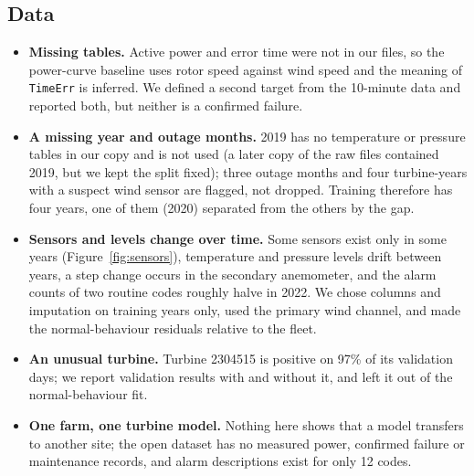 \documentclass[12pt,a4paper]{article}
\begin{document}
	\subsection{Data}
	\begin{itemize}
		\item \textbf{Missing tables.} Active power and error time were not in our files, so the power-curve baseline uses rotor speed against wind speed and the meaning of \texttt{TimeErr} is inferred. We defined a second target from the 10-minute data and reported both, but neither is a confirmed failure.
		\item \textbf{A missing year and outage months.} 2019 has no temperature or pressure tables in our copy and is not used (a later copy of the raw files contained 2019, but we kept the split fixed); three outage months and four turbine-years with a suspect wind sensor are flagged, not dropped. Training therefore has four years, one of them (2020) separated from the others by the gap.
		\item \textbf{Sensors and levels change over time.} Some sensors exist only in some years (Figure~\ref{fig:sensors}), temperature and pressure levels drift between years, a step change occurs in the secondary anemometer, and the alarm counts of two routine codes roughly halve in 2022. We chose columns and imputation on training years only, used the primary wind channel, and made the normal-behaviour residuals relative to the fleet.
		\item \textbf{An unusual turbine.} Turbine 2304515 is positive on 97\% of its validation days; we report validation results with and without it, and left it out of the normal-behaviour fit.
		\item \textbf{One farm, one turbine model.} Nothing here shows that a model transfers to another site; the open dataset has no measured power, confirmed failure or maintenance records, and alarm descriptions exist for only 12 codes.
	\end{itemize}
\end{document}
